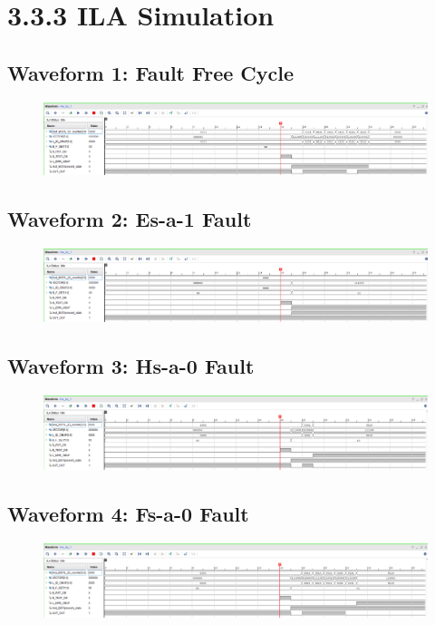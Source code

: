 \documentclass[11pt]{report}
\begin{document}
\section*{3.3.3 ILA Simulation}
\subsection*{Waveform 1: Fault Free Cycle}
\begin{figure}[H]
    \includegraphics[width=\columnwidth]{Reports/Lab4/Assets/3.3.3_fault-free.png}
\end{figure}

\subsection*{Waveform 2: Es-a-1 Fault}
\begin{figure}[H]
    \includegraphics[width=\columnwidth]{Reports/Lab4/Assets/3.3.3_fault-1.png}
\end{figure}

\subsection*{Waveform 3: Hs-a-0 Fault}
\begin{figure}[H]
    \includegraphics[width=\columnwidth]{Reports/Lab4/Assets/3.3.3_fault-2.png}
\end{figure}

\subsection*{Waveform 4: Fs-a-0 Fault}
\begin{figure}[H]
    \includegraphics[width=\columnwidth]{Reports/Lab4/Assets/3.3.3_fault-3.png}
\end{figure}
\end{document}
